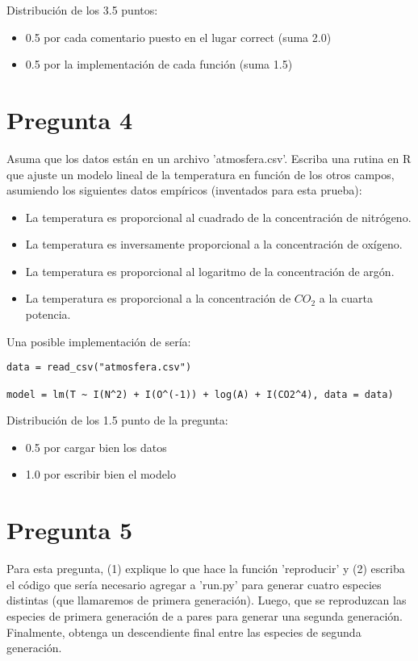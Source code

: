 \documentclass{article}
\begin{document}
Distribución de los 3.5 puntos: 
\begin{itemize}
    \item 0.5 por cada comentario puesto en el lugar correct (suma 2.0)
    \item 0.5 por la implementación de cada función (suma 1.5)
\end{itemize}
\section*{Pregunta 4}
Asuma que los datos están en un archivo 'atmosfera.csv'. Escriba una rutina en R que ajuste un modelo lineal de la temperatura en función de los otros campos, asumiendo los siguientes datos empíricos (inventados para esta prueba): 
    \begin{itemize}
        \item La temperatura es proporcional al cuadrado de la concentración de nitrógeno.
        \item La temperatura es inversamente proporcional a la concentración de oxígeno.
        \item La temperatura es proporcional al logaritmo de la concentración de argón.
        \item La temperatura es proporcional a la concentración de $CO_2$ a la cuarta potencia.
    \end{itemize}

Una posible implementación de sería:

\begin{verbatim}
data = read_csv("atmosfera.csv")

model = lm(T ~ I(N^2) + I(O^(-1)) + log(A) + I(CO2^4), data = data)
\end{verbatim}

Distribución de los 1.5 punto de la pregunta:
\begin{itemize}
    \item 0.5 por cargar bien los datos
    \item 1.0 por escribir bien el modelo
\end{itemize}
\section*{Pregunta 5}
Para esta pregunta, (1) explique lo que hace la función 'reproducir' y (2) escriba el código que sería necesario agregar a 'run.py' para generar cuatro especies distintas (que llamaremos de primera generación). Luego, que se reproduzcan las especies de primera generación de a pares para generar una segunda generación. Finalmente, obtenga un descendiente final entre las especies de segunda generación.
\end{document}
